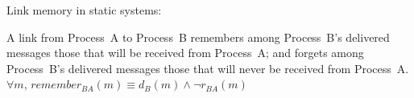 \documentclass[10pt, xcolor={usenames, dvipsnames}]{beamer}
\newcommand{\cmark}{\ding{51}}
\newcommand{\YES}[1]{\textcolor{green}{#1}}
\begin{document}
\begin{frame}{Link memory in static systems: \YES{\cmark}}

  \begin{definition}
    A link from Process~A to Process~B remembers among Process~B's delivered
    messages those that will be received from Process~A; and forgets among
    Process~B's delivered messages those that will never be received from
    Process~A.
    $\forall m,\, remember_{BA}(m) \equiv d_B(m) \wedge \neg r_{BA}(m)$
  \end{definition}

  \vspace{1em}




\end{frame}
\end{document}
